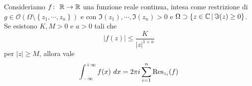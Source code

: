 \begin{proposition}[Caso I]
  \label{prop:caso-i}
  Consideriamo $f \colon\ \mathbb{R} \rightarrow \mathbb{R}$ una funzione reale continua, intesa come
  restrizione di $g \in \mathcal{O}(\Omega \setminus \left\{ z_1, \cdots,z_n
  \right\})$ e con $\Im(z_1), \cdots,\Im(z_n) > 0$ e $\Omega \supset \left\{
  z \in \mathbb{C} \,\middle|\, \Im(z) \ge 0 \right\}$. Se esistono $K,M > 0$ e $a > 0$ 
  tali che 
  \begin{equation*}
    |f(z)| \le \frac{K}{|z|^{1+a}}
  \end{equation*}
  per $|z| \ge M$, allora vale
  \begin{equation}
    \label{eq:integrale_improprio_no_poli_reali}
    \int_{-\infty}^{+\infty} f(x)\ dx = 2\pi i \sum_{i=1}^{n} \operatorname{Res}_{z_i}(f)
  \end{equation}
\end{proposition}
